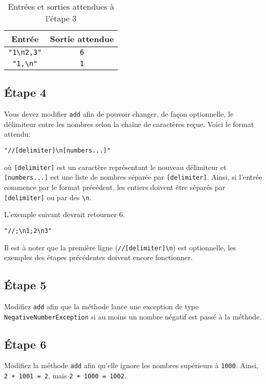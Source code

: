 \documentclass[french]{article}
\begin{document}
\begin{table}[h]
    \centering
    \begin{tabular}{|c|c|}
        \hline
        \textbf{Entrée} & \textbf{Sortie attendue} \\\hline\hline
        \texttt{"1\textbackslash n2,3"} & \texttt{6} \\\hline
        \texttt{"1,\textbackslash n"}   & \texttt{1} \\\hline
    \end{tabular}
    \caption{Entrées et sorties attendues à l'étape 3}
    \label{tab:input-step3}
\end{table}

\subsection{Étape 4}
Vous devez modifier \texttt{add} afin de pouvoir changer, de façon optionnelle, le délimiteur entre les nombres selon la chaîne de caractères reçue. Voici le format attendu:

\begin{lstlisting}
"//[delimiter]\n[numbers...]"
\end{lstlisting}

où \texttt{[delimiter]} est un caractère représentant le nouveau délimiteur et \texttt{[numbers...]} est une liste de nombres séparée par \texttt{[delimiter]}. Ainsi, si l'entrée commence par le format précédent, les entiers doivent être séparés par \texttt{[delimiter]} ou par des \texttt{\textbackslash n}.

L'exemple suivant devrait retourner 6.

\begin{lstlisting}
"//;\n1;2\n3"
\end{lstlisting}

Il est à noter que la première ligne (\texttt{//[delimiter]\textbackslash n}) est optionnelle, les exemples des étapes précédentes doivent encore fonctionner.

\subsection{Étape 5}
Modifiez \texttt{add} afin que la méthode lance une exception de type \texttt{NegativeNumberException} si au moins un nombre négatif est passé à la méthode.

\subsection{Étape 6}
Modifiez la méthode \texttt{add} afin qu'elle ignore les nombres supérieurs à \texttt{1000}. Ainsi, \texttt{2 + 1001 = 2}, mais \texttt{2 + 1000 = 1002}.
\end{document}
